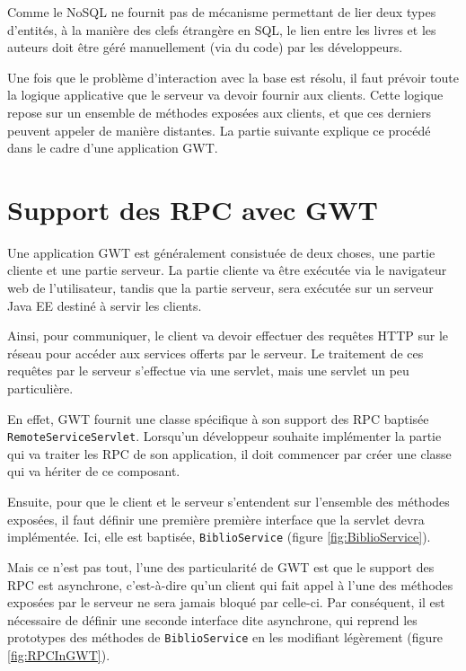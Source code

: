 
Comme le NoSQL ne fournit pas de mécanisme permettant de lier deux types d'entités, à la manière des clefs étrangère en SQL, le lien entre les livres et les auteurs doit être géré manuellement (via du code) par les développeurs.

Une fois que le problème d'interaction avec la base est résolu, il faut prévoir toute la logique applicative que le serveur va devoir fournir aux clients. Cette logique repose sur un ensemble de méthodes exposées aux clients, et que ces derniers peuvent appeler de manière distantes. La partie suivante explique ce procédé dans le cadre d'une application GWT.  
  
\section{Support des RPC avec GWT}
Une application GWT est généralement consistuée de deux choses, une partie cliente et une partie serveur. La partie cliente va être exécutée via le navigateur web de l'utilisateur, tandis que la partie serveur, sera exécutée sur un serveur Java EE destiné à servir les clients.

Ainsi, pour communiquer, le client va devoir effectuer des requêtes HTTP sur le réseau pour accéder aux services offerts par le serveur. Le traitement de ces requêtes par le serveur s'effectue via une servlet, mais une servlet un peu particulière.

En effet, GWT fournit une classe spécifique à son support des RPC baptisée \verb|RemoteServiceServlet|. Lorsqu'un développeur souhaite implémenter la partie qui va traiter les RPC de son application, il doit commencer par créer une classe qui va hériter de ce composant.

Ensuite, pour que le client et le serveur s'entendent sur l'ensemble des méthodes exposées, il faut définir une première première interface que la servlet devra implémentée. Ici, elle est baptisée, \verb|BiblioService| (figure \ref{fig:BiblioService}).


Mais ce n'est pas tout, l'une des particularité de GWT est que le support des RPC est asynchrone, c'est-à-dire qu'un client qui fait appel à l'une des méthodes exposées par le serveur ne sera jamais bloqué par celle-ci. Par conséquent, il est nécessaire de définir une seconde interface dite asynchrone, qui reprend les prototypes des méthodes de \verb|BiblioService| en les modifiant légèrement (figure \ref{fig:RPCInGWT}).

